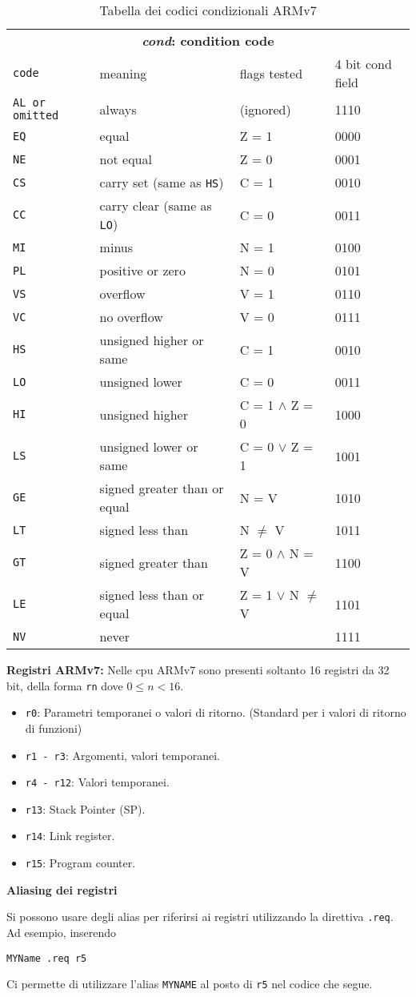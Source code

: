 \def\code#1#2#3#4{\texttt{#1} & \small #2 & #3 & #4\\}
\begin{table}[H]
	\centering
	\caption{Tabella dei codici condizionali ARMv7}
	\label{tab:codes}
	\begin{tabular}{l@{\hspace{5mm}}lll}
	\multicolumn{4}{c}{\bfseries \emph{cond}: condition code} \\
	\code{code}{meaning}{flags tested}{4 bit cond field}
	\hline
	\code{AL \textrm{or omitted}}{always}{(ignored)}{1110}
	\code{EQ}{equal}{Z = 1}{0000}
	\code{NE}{not equal}{Z = 0}{0001}
	\code{CS}{carry set (same as \texttt{HS})}{C = 1}{0010}
	\code{CC}{carry clear (same as \texttt{LO})}{C = 0}{0011}
	\code{MI}{minus}{N = 1}{0100}
	\code{PL}{positive or zero}{N = 0}{0101}
	\code{VS}{overflow}{V = 1}{0110}
	\code{VC}{no overflow}{V = 0}{0111}
	\code{HS}{unsigned higher or same}{C = 1}{0010}
	\code{LO}{unsigned lower}{C = 0}{0011}
	\code{HI}{unsigned higher}{C = 1 $\wedge$ Z = 0}{1000}
	\code{LS}{unsigned lower or same}{C = 0 $\vee$ Z = 1}{1001}
	\code{GE}{signed greater than or equal}{N = V}{1010}
	\code{LT}{signed less than}{N $\neq$ V}{1011}
	\code{GT}{signed greater than}{Z = 0 $\wedge$ N = V}{1100}
	\code{LE}{signed less than or equal}{Z = 1 $\vee$ N $\neq$ V}{1101}
	\code{NV}{never}{}{1111}
	\hline
	\end{tabular}
\end{table}

\begin{defn}
\textbf{Registri ARMv7:}
Nelle cpu ARMv7 sono presenti soltanto 16 registri da 32 bit, della forma \verb|rn| dove $ 0 \leq n < 16 $.

\begin{itemize}
	\item \verb|r0|: Parametri temporanei o valori di ritorno. (Standard per i valori di ritorno di funzioni)
	\item \verb|r1 - r3|: Argomenti, valori temporanei.
	\item \verb|r4 - r12|: Valori temporanei.
	\item \verb|r13|: Stack Pointer (SP).
	\item \verb|r14|: Link register.
	\item \verb|r15|: Program counter.
\end{itemize}
\end{defn}


\begin{defn}
	\textbf{Aliasing dei registri}

	Si possono usare degli alias per riferirsi ai registri utilizzando la direttiva
	\verb|.req|. Ad esempio, inserendo
\begin{lstlisting}[style=arm]
	MYName .req r5
\end{lstlisting}
	Ci permette di utilizzare l'alias \verb|MYNAME| al posto di \verb|r5| nel codice che segue.
\end{defn}

